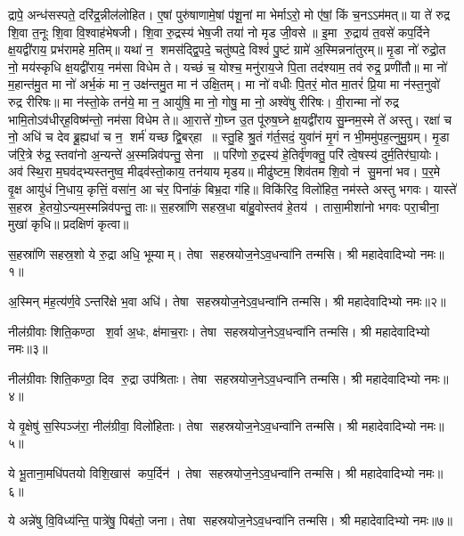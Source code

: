 द्रापे॒ अन्ध॑सस्पते॒ दरि॑द्र॒न्नील॑लोहित। ए॒षां पुरु॑षाणामे॒षां प॑शू॒नां मा भेर्माऽरो॒ मो ए॑षां॒ किं च॒नऽऽम॑मत्॥ या ते॑ रुद्र शि॒वा त॒नूः शि॒वा वि॒श्वाह॑भेषजी। शि॒वा रु॒द्रस्य॑ भेष॒जी तया॑ नो मृड जी॒वसे॥ इ॒मा रु॒द्राय॑ त॒वसे॑ कप॒र्दिने क्ष॒यद्वी॑राय॒ प्रभ॑रामहे म॒तिम्॥ यथा॑ न॒ शमस॑द्द्वि॒पदे॒ चतु॑ष्पदे॒ विश्वं॑ पु॒ष्टं ग्रामे॑ अ॒स्मिन्नना॑तुरम्॥ मृ॒डा नो॑ रुद्रो॒त नो॒ मय॑स्कृधि क्ष॒यद्वी॑राय॒ नम॑सा विधेम ते। यच्छं च॒ योश्च॒ मनु॑राय॒जे पि॒ता तद॑श्याम॒ तव॑ रुद्र॒ प्रणी॑तौ॥ मा नो॑ म॒हान्त॑मु॒त मा नो॑ अर्भ॒कं मा न॒ उक्ष॑न्तमु॒त मा न॑ उक्षि॒तम्। मा नो॑ वधीः पि॒तरं॒ मोत मा॒तरं॑ प्रि॒या मा न॑स्त॒नुवो॑ रुद्र रीरिषः॥ मा न॑स्तो॒के तन॑ये॒ मा न॒ आयु॑षि॒ मा नो॒ गोषु॒ मा नो॒ अश्वे॑षु रीरिषः। वी॒रान्मा नो॑ रुद्र भामि॒तोऽव॑धीर्‌ह॒विष्म॑न्तो॒ नम॑सा विधेम ते॥ आ॒रात्ते॑ गो॒घ्न उ॒त पू॑रुष॒घ्ने क्ष॒यद्वी॑राय सु॒म्नम॒स्मे ते॑ अस्तु। रक्षा॑ च नो॒ अधि॑ च देव ब्रू॒ह्यधा॑ च न॒ शर्म॑ यच्छ द्वि॒बर्‌हा॥ स्तु॒हि श्रु॒तं ग॑र्त॒सदं॒ युवा॑नं मृ॒गं न भी॒ममु॑पह॒त्नुमु॒ग्रम्। मृ॒डा ज॑रि॒त्रे रु॑द्र॒ स्तवा॑नो अ॒न्यन्ते॑ अ॒स्मन्निव॑पन्तु॒ सेना॥ परि॑णो रु॒द्रस्य॑ हे॒तिर्वृ॑णक्तु॒ परि॑ त्वे॒षस्य॑ दुर्म॒तिर॑घा॒योः। अव॑ स्थि॒रा म॒घव॑द्भ्यस्तनुष्व॒ मीढ्व॑स्तो॒काय॒ तन॑याय मृडय॥ मीढु॑ष्टम॒ शिव॑तम शि॒वो न॑ सु॒मना॑ भव। प॒र॒मे वृ॒क्ष आयु॑धं नि॒धाय॒ कृत्तिं॒ वसा॑न॒ आ च॑र॒ पिना॑कं॒ बिभ्र॒दा ग॑हि॥ विकि॑रिद॒ विलो॑हित॒ नम॑स्ते अस्तु भगवः। यास्ते॑ स॒हस्र हे॒तयो॒ऽन्यम॒स्मन्निव॑पन्तु॒ ताः॥ स॒हस्रा॑णि सहस्र॒धा बा॑हु॒वोस्तव॑ हे॒तय॑। तासा॒मीशा॑नो भगवः परा॒चीना॒ मुखा॑ कृधि॥
प्रदक्षिणं कृत्वा॥


{\small \closesection}



स॒हस्रा॑णि सहस्र॒शो ये रु॒द्रा अधि॒ भूम्याम्। तेषा सहस्रयोज॒ने\-ऽव॒धन्वा॑नि तन्मसि। श्री महादेवादिभ्यो नमः॥१॥

अ॒स्मिन् म॑ह॒त्य॑र्ण॒वेऽन्तरि॑क्षे भ॒वा अधि॑। तेषा सहस्रयोज॒ने\-ऽव॒धन्वा॑नि तन्मसि। श्री महादेवादिभ्यो नमः॥२॥

नील॑ग्रीवाः शिति॒कण्ठा श॒र्वा अ॒धः, क्ष॑माच॒राः। तेषा सहस्रयोज॒ने\-ऽव॒धन्वा॑नि तन्मसि। श्री महादेवादिभ्यो नमः॥३॥

नील॑ग्रीवाः शिति॒कण्ठा॒ दिव रु॒द्रा उप॑श्रिताः। तेषा सहस्रयोज॒ने\-ऽव॒धन्वा॑नि तन्मसि। श्री महादेवादिभ्यो नमः॥४॥

ये वृ॒क्षेषु॑ स॒स्पिञ्ज॑रा॒ नील॑ग्रीवा॒ विलो॑हिताः। तेषा सहस्रयोज॒ने\-ऽव॒धन्वा॑नि तन्मसि। श्री महादेवादिभ्यो नमः॥५॥

ये भू॒ताना॒मधि॑पतयो विशि॒खास॑ कप॒र्दिन॑। तेषा सहस्रयोज॒ने\-ऽव॒धन्वा॑नि तन्मसि। श्री महादेवादिभ्यो नमः॥६॥

ये अन्ने॑षु वि॒विध्य॑न्ति॒ पात्रे॑षु॒ पिब॑तो॒ जना\sn। तेषा सहस्रयोज॒ने\-ऽव॒धन्वा॑नि तन्मसि। श्री महादेवादिभ्यो नमः॥७॥

